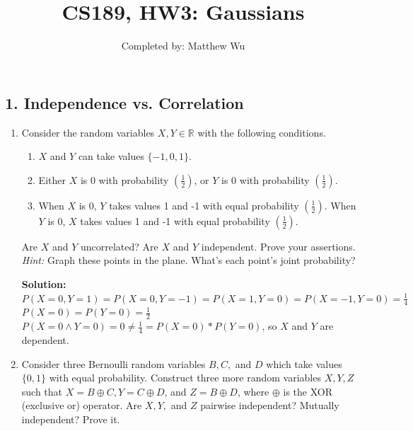 \documentclass{article}
\title{CS189, HW3: Gaussians}
\author{ Completed by: Matthew Wu}
\date{}
\newcommand{\solution}{\textbf{Solution: }}
\newcommand{\R}{\mathbb{R}}
\begin{document}
\maketitle

\subsection*{1. Independence vs. Correlation}
\begin{enumerate}[label=(\alph*)]
    \item Consider the random variables $X, Y \in \R$ with the following conditions.
    \begin{enumerate}[label=(\roman*)]
        \item $X$ and $Y$ can take values $\{-1, 0, 1\}$. 
        \item Either $X$ is 0 with probability $(\frac{1}{2})$, or $Y$ is 0 with probability $(\frac{1}{2})$.
        \item When $X$ is 0, $Y$ takes values 1 and -1 with equal probability $(\frac{1}{2})$. When $Y$ is 0, $X$ takes values 1 and -1 with equal probability $(\frac{1}{2})$.
    \end{enumerate}
    
    Are $X$ and $Y$ uncorrelated? Are $X$ and $Y$ independent. Prove your assertions. \emph{Hint:} Graph these points in the plane. What’s each point’s joint probability?
    
    \begin{mdframed} \solution\\
    $P(X=0,Y=1)=P(X=0,Y=-1)=P(X=1,Y=0)=P(X=-1,Y=0)=\frac{1}{4}$\\
    $P(X=0)=P(Y=0)=\frac{1}{2}$\\
    $P(X=0 \wedge Y=0)=0 \neq \frac{1}{4} = P(X=0)*P(Y=0)$, so $X$ and $Y$ are dependent.
    \end{mdframed}
    
    \item Consider three Bernoulli random variables $B, C,$ and $D$ which take values $\{0, 1\}$ with equal probability. Construct three more random variables $X, Y, Z$ such that $X = B \oplus C, Y = C \oplus D$, and $Z = B \oplus D$, where $\oplus$ is the XOR (exclusive or) operator. Are $X, Y,$ and $Z$ pairwise independent? Mutually independent? Prove it.
    

\end{enumerate}
\end{document}
